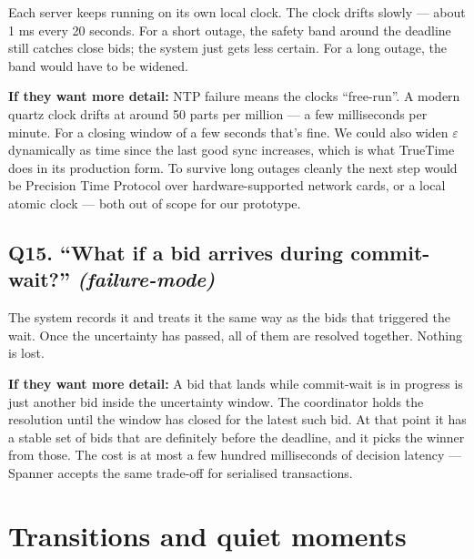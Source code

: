 \documentclass[a4paper,11pt]{article}
\begin{document}
\begin{shortans}
Each server keeps running on its own local clock. The clock
drifts slowly --- about 1 ms every 20 seconds. For a short
outage, the safety band around the deadline still catches close
bids; the system just gets less certain. For a long outage, the
band would have to be widened.
\end{shortans}

\begin{deepans}
\textbf{If they want more detail:} NTP failure means the clocks
``free-run''. A modern quartz clock drifts at around 50 parts per
million --- a few milliseconds per minute. For a closing window of
a few seconds that's fine. We could also widen $\varepsilon$
dynamically as time since the last good sync increases, which is
what TrueTime does in its production form. To survive long
outages cleanly the next step would be Precision Time Protocol
over hardware-supported network cards, or a local atomic clock
--- both out of scope for our prototype.
\end{deepans}

\subsection{Q15. ``What if a bid arrives during commit-wait?'' \textnormal{\small\itshape (failure-mode)}}

\begin{shortans}
The system records it and treats it the same way as the bids that
triggered the wait. Once the uncertainty has passed, all of them
are resolved together. Nothing is lost.
\end{shortans}

\begin{deepans}
\textbf{If they want more detail:} A bid that lands while
commit-wait is in progress is just another bid inside the
uncertainty window. The coordinator holds the resolution until
the window has closed for the latest such bid. At that point it
has a stable set of bids that are definitely before the deadline,
and it picks the winner from those. The cost is at most a few
hundred milliseconds of decision latency --- Spanner accepts the
same trade-off for serialised transactions.
\end{deepans}

\section{Transitions and quiet moments}
\end{document}

